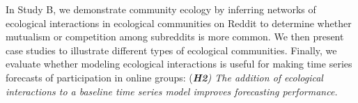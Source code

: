\documentclass[letterpaper]{article}\usepackage[]{graphicx}\usepackage[]{color}
\begin{document}
In Study B, we demonstrate community ecology by inferring networks of ecological interactions in ecological communities on Reddit to determine whether mutualism or competition among subreddits is more common. We then present case studies to illustrate different types of ecological communities.
Finally, we evaluate whether modeling ecological interactions is useful for making time series forecasts of participation in online groups:
(\textit{\textbf{H2}) The addition of ecological interactions to a baseline time series model improves forecasting performance.}

\end{document}
